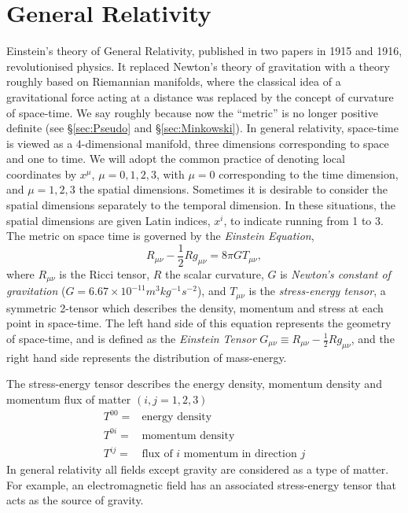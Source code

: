 



\chapter{General Relativity}

Einstein's theory of General Relativity, published in two papers in 1915 and 1916, revolutionised physics. It replaced Newton's theory of gravitation with a theory roughly based on Riemannian manifolds, where the classical idea of a gravitational force acting at a distance was replaced by the concept of curvature of space-time. We say roughly because now the ``metric'' is no longer positive definite (see {\S}\ref{sec:Pseudo} and {\S}\ref{sec:Minkowski}). In general relativity, space-time is viewed as a 4-dimensional manifold, three dimensions corresponding to space and one to time. We will adopt the common practice of denoting local coordinates by $x^\mu$, $\mu=0,1,2,3$, with $\mu=0$ corresponding to the time dimension, and $\mu=1,2,3$ the spatial dimensions. Sometimes it is desirable to consider the spatial dimensions separately to the temporal dimension. In these situations, the spatial dimensions are given Latin indices, $x^i$, to indicate running from 1 to 3. \\

The metric on space time is governed by the \textit{Einstein Equation},
\begin{equation}
R_{\mu \nu}-\frac{1}{2}Rg_{\mu \nu} = 8\pi G T_{\mu \nu}, 
\label{eq:Einstein} 
\end{equation} 
where $R_{\mu \nu}$ is the Ricci tensor, $R$ the scalar curvature, $G$ is \textit{Newton's constant of gravitation} ($G=6.67\times10^{-11} m^{3}kg^{-1}s^{-2}$), and $T_{\mu \nu}$ is the \textit{stress-energy tensor}, a symmetric 2-tensor which describes the density, momentum and stress at each point in space-time. The left hand side of this equation represents the geometry of space-time, and is defined as the \textit{Einstein Tensor} $G_{\mu \nu} \equiv R_{\mu \nu}-\frac{1}{2}Rg_{\mu \nu}$, and the right hand side represents the distribution of mass-energy. 

The stress-energy tensor describes the energy density, momentum density and momentum flux of matter $(i,j=1,2,3)$
\begin{eqnarray*}
T^{00} =& \mbox{energy density}\\
T^{0i} =& \mbox{momentum density}\\
T^{ij} =& \mbox{flux of $i$ momentum in direction $j$}
\end{eqnarray*}
In general relativity all fields except gravity are considered as a type of matter. For example, an electromagnetic field has an associated stress-energy tensor that acts as the source of gravity.

